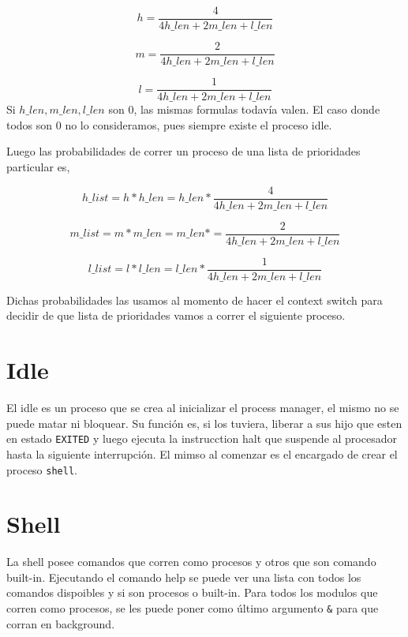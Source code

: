 \documentclass{article}
\begin{document}
\begin{equation*}
h = \frac{4}{4 h\_len + 2 m\_len + l\_len}
\end{equation*}

\begin{equation*}
m = \frac{2}{4 h\_len + 2 m\_len + l\_len}
\end{equation*}

\begin{equation*}
l = \frac{1}{4 h\_len + 2 m\_len + l\_len}
\end{equation*}
Si $h\_len, m\_len, l\_len$ son 0, las mismas formulas todavía valen. El caso donde todos son 0 no lo consideramos, pues siempre existe el proceso idle.

Luego las probabilidades de correr un proceso de una lista de prioridades particular es,

\begin{equation*}
h\_list = h * h\_len = h\_len *  \frac{4}{4 h\_len + 2 m\_len + l\_len}
\end{equation*}

\begin{equation*}
m\_list = m * m\_len = m\_len * = \frac{2}{4 h\_len + 2 m\_len + l\_len}
\end{equation*}

\begin{equation*}
l\_list = l * l\_len = l\_len * \frac{1}{4 h\_len + 2 m\_len + l\_len}
\end{equation*}

Dichas probabilidades las usamos al momento de hacer el context switch para decidir de que lista de prioridades vamos a correr el siguiente proceso.

\section {Idle}
El idle es un proceso que se crea al inicializar el process manager, el mismo no se puede matar ni bloquear. Su función es, si los tuviera, liberar a sus hijo que esten en estado \texttt{EXITED} y luego ejecuta la instrucction halt que suspende al procesador hasta la siguiente interrupción. El mimso al comenzar es el encargado de crear el proceso \texttt{shell}.

\section {Shell}
La shell posee comandos que corren como procesos y otros que son comando built-in. Ejecutando el comando help se puede ver una lista con todos los comandos dispoibles y si son procesos o built-in. Para todos los modulos que corren como procesos, se les puede poner como último argumento \texttt{\&} para que corran en background.
\end{document}
